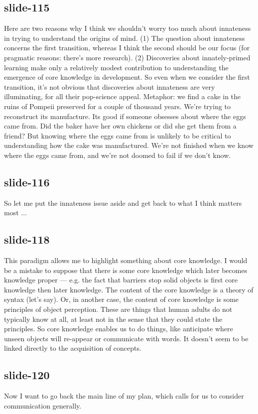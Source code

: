 \documentclass[12pt,\papersize]{extarticle}
\begin{document}
 
\subsection{slide-115}
Here are two reasons why I think we shouldn't worry too much about innateness in trying to understand the origins of mind.
(1) The question about innateness concerns the first transition, whereas I think the second should be our focus (for pragmatic reasons: there's more research).
(2) Discoveries about innately-primed learning make only a relatively modest contribution to understanding the emergence of core knowledge in development. So even when we consider the first transition, it's not obvious that discoveries about innateness are very illuminating, for all their pop-science appeal.
Metaphor: we find a cake in the ruins of Pompeii preserved for a couple of thousand years. We're trying to reconstruct its manufacture.
Its good if someone obsesses about where the eggs came from. Did the baker have her own chickens or did she get them from a friend?
But knowing where the eggs came from is unlikely to be critical to understanding how the cake was manufactured.
We're not finished when we know where the eggs came from, and we're not doomed to fail if we don't know.
 
 
\subsection{slide-116}
So let me put the innateness issue aside and get back to what I think matters most ...
 
 
\subsection{slide-118}
This paradigm allows me to highlight something about core knowledge.
I would be a mistake to suppose that there is some core knowledge which later becomes knowledge proper --- e.g. the fact that barriers stop solid objects is first core knowledge then later knowledge.
The content of the core knowledge is a theory of syntax (let's say).
Or, in another case, the content of core knowledge is some principles of object perception.
These are things that human adults do not typically know at all, at least not in the sense that they could state the principles.
So core knowledge enables us to do things, like anticipate where unseen objects will re-appear or communicate with words.
It doesn't seem to be linked directly to the acquisition of concepts.
 
 
\subsection{slide-120}
Now I want to go back the main line of my plan, which calls for us to consider communication generally.
 
\end{document}
